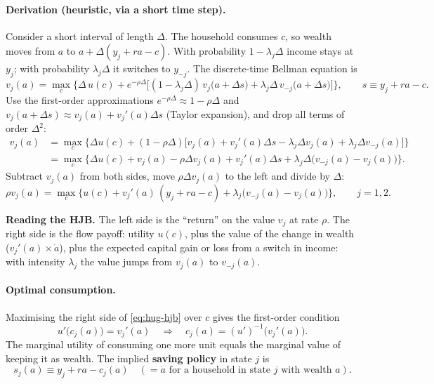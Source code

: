 \paragraph{Derivation (heuristic, via a short time step).}
Consider a short interval of length $\Delta$. The household consumes $c$, so wealth moves from $a$ to $a+\Delta(y_j+ra-c)$. With probability $1-\lambda_j\Delta$ income stays at $y_j$; with probability $\lambda_j\Delta$ it switches to $y_{-j}$. The discrete-time Bellman equation is
\begin{equation*}
  v_j(a)=\max_c\Big\{\Delta\,u(c) + e^{-\rho\Delta}\Big[(1-\lambda_j\Delta)\,v_j\big(a+\Delta s\big) + \lambda_j\Delta\, v_{-j}\big(a+\Delta s\big)\Big]\Big\},
  \qquad s\equiv y_j+ra-c.
\end{equation*}
Use the first-order approximations $e^{-\rho\Delta}\approx 1-\rho\Delta$ and $v_j(a+\Delta s)\approx v_j(a)+v_j'(a)\Delta s$ (Taylor expansion), and drop all terms of order $\Delta^2$:
\begin{align*}
  v_j(a) &= \max_c\Big\{\Delta u(c) + (1-\rho\Delta)\big[v_j(a)+v_j'(a)\Delta s - \lambda_j\Delta v_j(a) + \lambda_j\Delta v_{-j}(a)\big]\Big\}\\
  &= \max_c\Big\{\Delta u(c) + v_j(a) - \rho\Delta v_j(a) + v_j'(a)\Delta s + \lambda_j\Delta\big(v_{-j}(a)-v_j(a)\big)\Big\}.
\end{align*}
Subtract $v_j(a)$ from both sides, move $\rho\Delta v_j(a)$ to the left and divide by $\Delta$:
\begin{equation}\label{eq:hug-hjb}
  \rho v_j(a) = \max_c\Big\{u(c) + v_j'(a)\,(y_j+ra-c) + \lambda_j\big(v_{-j}(a)-v_j(a)\big)\Big\},\qquad j=1,2.
\end{equation}

\textbf{Reading the HJB.} The left side is the ``return'' on the value $v_j$ at rate $\rho$. The right side is the flow payoff: utility $u(c)$, plus the value of the change in wealth ($v_j'(a)\times\dot a$), plus the expected capital gain or loss from a switch in income: with intensity $\lambda_j$ the value jumps from $v_j(a)$ to $v_{-j}(a)$.

\paragraph{Optimal consumption.} Maximising the right side of \eqref{eq:hug-hjb} over $c$ gives the first-order condition
\begin{equation}\label{eq:hug-foc}
  u'\big(c_j(a)\big) = v_j'(a)\quad\Longrightarrow\quad c_j(a)=(u')^{-1}\big(v_j'(a)\big).
\end{equation}
The marginal utility of consuming one more unit equals the marginal value of keeping it as wealth. The implied \textbf{saving policy} in state $j$ is
\begin{equation}\label{eq:hug-saving}
  s_j(a)\equiv y_j + ra - c_j(a)\quad(=\dot a\text{ for a household in state }j\text{ with wealth }a).
\end{equation}

